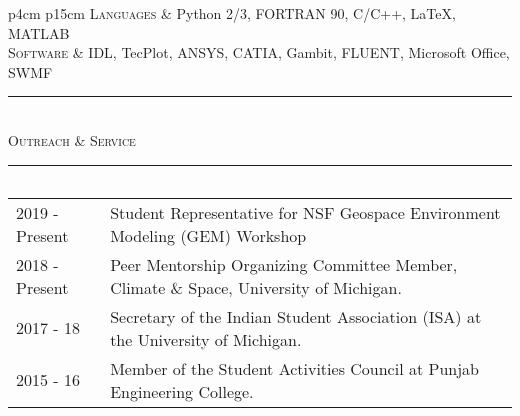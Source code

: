 \documentclass[10pt]{article}
\begin{document}
\vspace{-1em}
\begin{tabular}{p{4cm} p{15cm}}
\textsc{{Languages}} & Python 2/3, FORTRAN 90, C/C++, \LaTeX, MATLAB \\ 
\textsc{{Software}} & IDL, TecPlot, ANSYS, CATIA, Gambit, FLUENT, Microsoft Office, SWMF
\end{tabular}

\vspace{-0.75em}


\begin{center}
{\noindent\rule[0.5ex]{\linewidth}{0.5pt}\\
\vspace{-0.5em}\large{\textsc{Outreach \& Service}}\\
\vspace{-0.25em}
\noindent\rule[0.5ex]{\linewidth}{0.5pt}}
\end{center}

\vspace{-1em}
\begin{tabular}{p{4.1cm} p{12.65cm}}
\end{tabular}
\begin{tabular}{p{2.1cm} p{14.65cm}}
2019 - Present & Student Representative for NSF Geospace Environment Modeling (GEM) Workshop\\
2018 - Present & Peer Mentorship Organizing Committee Member, Climate \& Space, University of Michigan.\\
2017 - 18 & Secretary of the Indian Student Association (ISA) at the University of Michigan. \\
2015 - 16 & Member of the Student Activities Council at Punjab Engineering College.\\
\end{tabular}
\end{document}
